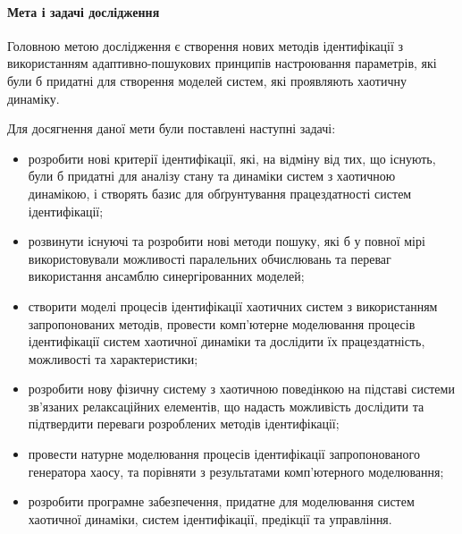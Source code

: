 \paragraph{Мета і задачі дослідження}

Головною метою дослідження є створення нових методів ідентифікації з
використанням адаптивно-пошукових принципів настроювання параметрів, які
були б придатні для створення моделей систем, які проявляють хаотичну динаміку.

Для досягнення даної мети були поставлені наступні задачі:

\begin{itemize}

  \item
  розробити нові критерії ідентифікації, які, на відміну від тих, що
  існують, були б придатні для аналізу стану та динаміки
  систем з хаотичною динамікою, і створять базис для обґрунтування працездатності систем
  ідентифікації;

  \item
  розвинути існуючі та розробити нові методи пошуку, які б
  у повної мірі використовували можливості
  паралельних обчислювань та переваг використання ансамблю
  синергірованних моделей;


  \item
  створити моделі процесів
  ідентифікації хаотичних систем з використанням запропонованих методів,
  провести комп'ютерне моделювання процесів ідентифікації систем
  хаотичної динаміки та дослідити їх працездатність, можливості та
  характеристики;

  \item
  розробити нову фізичну систему з хаотичною поведінкою
  на підставі системи зв'язаних релаксаційних елементів,
  що надасть можливість дослідити та підтвердити переваги
  розроблених методів ідентифікації;

  \item
  провести натурне моделювання процесів ідентифікації запропонованого
  генератора хаосу, та порівняти з результатами комп'ютерного моделювання;

  \item
  розробити програмне забезпечення, придатне для моделювання систем
  хаотичної динаміки, систем ідентифікації, предікції та управління.

\end{itemize}



